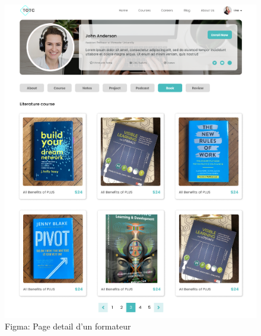 \begin{figure}[H]
    \centering
    \begin{minipage}{0.45\textwidth}
        \centering
        \includegraphics[width=\textwidth]{Figures/AuthorDetails.PNG}
        \caption{Figma: Page detail d'un formateur}
    \end{minipage}
    \hfill
    \begin{minipage}{0.45\textwidth}
        \centering

\end{minipage}
\end{figure}
